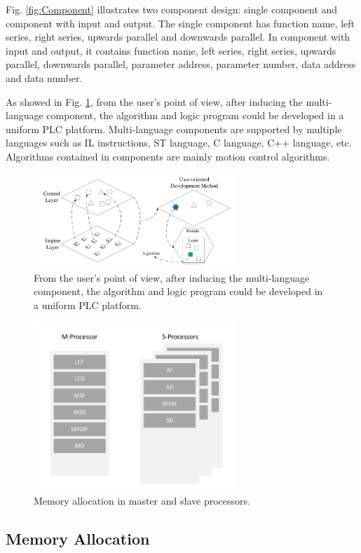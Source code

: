 \documentclass[journal,UTF8]{IEEEtran}
\begin{document}
Fig. \ref{fig:Component} illustrates two component design: single component and component with input and output. The single component has function name, left series, right series, upwards parallel and downwards parallel. In component with input and output, it contains function name, left series, right series, upwards parallel, downwards parallel, parameter address, parameter number, data address and data number.

As showed in Fig. \ref{fig:SoftwareStructure}, from the user's point of view, after inducing the multi-language component, the algorithm and logic program could be developed in a uniform PLC platform. Multi-language components are supported by multiple languages such as IL instructions, ST language, C language, C++ language, etc. Algorithms contained in components are mainly motion control algorithms.
\begin{figure}
	\centering
	\includegraphics[width=3in]{fig/FIG3.pdf}
	\caption{ From the user's point of view, after inducing the multi-language component, the algorithm and logic program could be developed in a uniform PLC platform.}
	\label{fig:SoftwareStructure}
\end{figure}


\begin{figure}
	\centering
	\includegraphics[width=3in]{fig/FIG4.pdf}
	\caption{ Memory allocation in master and slave processors.}
	\label{fig:Memory}
\end{figure}

\subsection{Memory Allocation}  
\end{document}

